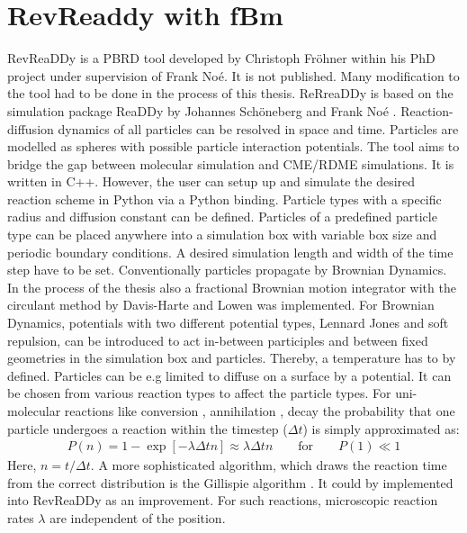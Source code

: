\documentclass[
  a4paper,BCOR10mm,twoside,
  headsepline,footsepline,%
  fleqn,openbib
]{scrbook}
\begin{document}
\section{RevReaddy with fBm} 
RevReaDDy is a PBRD tool developed by Christoph Fröhner within his PhD project under supervision of Frank Noé. It is not published. Many modification to the tool had to be done in the process of this thesis. ReRreaDDy is based on the simulation package ReaDDy by Johannes Schöneberg and Frank Noé \cite{10.1371/journal.pone.0074261}. Reaction-diffusion dynamics of all particles can be resolved in space and time. Particles are modelled as spheres with possible particle interaction potentials. The tool aims to bridge the gap between molecular simulation and CME/RDME simulations. It is written in C++. However, the user can setup up and simulate the desired reaction scheme in Python via a Python binding. Particle types with a specific radius and diffusion constant can be defined. Particles of a predefined particle type can be placed anywhere into a simulation box with variable box size and periodic boundary conditions. A desired simulation length and width of the time step have to be set. Conventionally particles propagate by Brownian Dynamics. In the process of the thesis also a fractional Brownian motion integrator with the circulant method by Davis-Harte \cite{Dieker2004}  and Lowen \cite{Lowen1999} was implemented. For Brownian Dynamics, potentials with two different potential types, Lennard Jones and soft repulsion, can be introduced to act in-between participles and between fixed geometries in the simulation box and particles. Thereby, a temperature has to by defined. Particles can be e.g limited to diffuse on a surface by a potential. It can be chosen from various reaction types to affect the particle types. For uni-molecular reactions like conversion , annihilation , decay  the probability that one particle undergoes a reaction within the timestep ($\Delta t$) is simply approximated as:
\begin{align} \label{propabilityreaction}
 P(n)=1- \exp[-\lambda \Delta t n] \approx \lambda \Delta t n \qquad \text{for} \qquad P(1)\ll 1
\end{align}
Here, $n=t/\Delta t$. A more sophisticated algorithm, which draws the reaction time from the correct distribution is the Gillispie algorithm \cite{Gillespie1977}. It could by implemented into RevReaDDy as an improvement. For such reactions,  microscopic reaction rates $\lambda$ are independent of the position.
\end{document}
